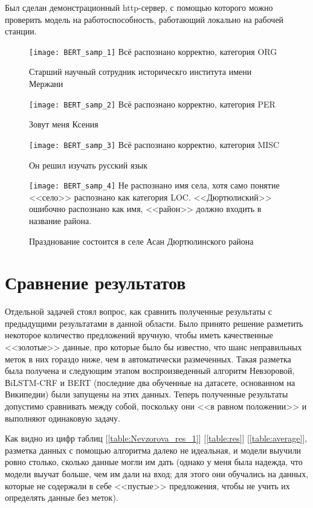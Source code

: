 Был сделан демонстрационный http-сервер, с помощью которого можно проверить модель на работоспособность, работающий локально на рабочей станции.


\begin{figure}[H]
\caption{Старший научный сотрудник историческго института имени Мержани}
\texttt{[image: BERT\_samp\_1]}
Всё распознано корректно, категория ORG
\label{fig:BERT_samp_1}
\end{figure}
\begin{figure}[H]
\caption{Зовут меня Ксения}
\texttt{[image: BERT\_samp\_2]}
Всё распознано корректно, категория PER
\label{fig:BERT_samp_2}
\end{figure}
\begin{figure}[H]
\caption{Он решил изучать русский язык}
\texttt{[image: BERT\_samp\_3]}
Всё распознано корректно, категория MISC
\label{fig:BERT_samp_3}
\end{figure}
\begin{figure}[H]
\caption{Празднование состоится в селе Асан Дюртюлинского района}
\texttt{[image: BERT\_samp\_4]}
Не распознано имя села, хотя само понятие <<село>> распознано как категория LOC. <<Дюртюлиский>> ошибочно распознано как имя, <<район>> должно входить в название района.
\label{fig:BERT_samp_4}
\end{figure}



\section{Сравнение результатов}

Отдельной задачей стоял вопрос, как сравнить полученные результаты с предыдущими результатами в данной области. Было принято решение разметить некоторое количество предложений вручную, чтобы иметь качественные <<золотые>> данные, про которые было бы известно, что шанс неправильных меток в них гораздо ниже, чем в автоматически размеченных. Такая разметка была получена и следующим этапом воспроизведенный алгоритм Невзоровой, ВiLSTM-CRF и BERT (последние два обученные на датасете, основанном на Википедии) были запущены на этих данных. Теперь полученные результаты допустимо сравнивать между собой, поскольку они <<в равном положении>> и выполняют одинаковую задачу.

Как видно из цифр таблиц [\ref{table:Nevzorova_res_1}] [\ref{table:res}] [\ref{table:average}], разметка данных с помощью алгоритма далеко не идеальная, и модели выучили ровно столько, сколько данные могли им дать (однако у меня была надежда, что модели выучат больше, чем им дали на вход; для этого они обучались на данных, которые не содержали в себе <<пустые>> предложения, чтобы не учить их определять данные без меток). 

